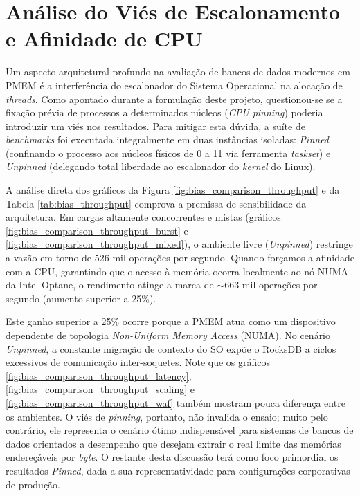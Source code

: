 \section{Análise do Viés de Escalonamento e Afinidade de CPU}
Um aspecto arquitetural profundo na avaliação de bancos de dados modernos em PMEM é a interferência do escalonador do Sistema Operacional na alocação de \textit{threads}. Como apontado durante a formulação deste projeto, questionou-se se a fixação prévia de processos a determinados núcleos (\textit{CPU pinning}) poderia introduzir um viés nos resultados. Para mitigar esta dúvida, a suíte de \textit{benchmarks} foi executada integralmente em duas instâncias isoladas: \textit{Pinned} (confinando o processo aos núcleos físicos de 0 a 11 via ferramenta \textit{taskset}) e \textit{Unpinned} (delegando total liberdade ao escalonador do \textit{kernel} do Linux).

A análise direta dos gráficos da Figura \ref{fig:bias_comparison_throughput} e da Tabela \ref{tab:bias_throughput} comprova a premissa de sensibilidade da arquitetura. Em cargas altamente concorrentes e mistas (gráficos \ref{fig:bias_comparison_throughput_burst} e \ref{fig:bias_comparison_throughput_mixed}), o ambiente livre (\textit{Unpinned}) restringe a vazão em torno de 526 mil operações por segundo. Quando forçamos a afinidade com a CPU, garantindo que o acesso à memória ocorra localmente ao nó NUMA da Intel Optane, o rendimento atinge a marca de $\sim$663 mil operações por segundo (aumento superior a 25\%).

Este ganho superior a 25\% ocorre porque a PMEM atua como um dispositivo dependente de topologia \textit{Non-Uniform Memory Access} (NUMA). No cenário \textit{Unpinned}, a constante migração de contexto do SO expõe o RocksDB a ciclos excessivos de comunicação inter-soquetes. Note que os gráficos \ref{fig:bias_comparison_throughput_latency}, \ref{fig:bias_comparison_throughput_scaling} e \ref{fig:bias_comparison_throughput_waf} também mostram pouca diferença entre os ambientes. O viés de \textit{pinning}, portanto, não invalida o ensaio; muito pelo contrário, ele representa o cenário ótimo indispensável para sistemas de bancos de dados orientados a desempenho que desejam extrair o real limite das memórias endereçáveis por \textit{byte}. O restante desta discussão terá como foco primordial os resultados \textit{Pinned}, dada a sua representatividade para configurações corporativas de produção.


